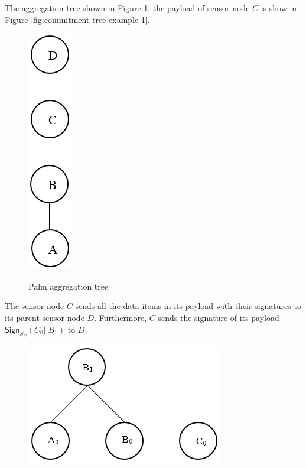 	\begin{exmp}
	The aggregation tree shown in Figure \ref{fig:Palm aggregation tree}, the payload of sensor node $C$ is show in Figure \ref{fig:commitment-tree-example-1}.
			\begin{figure}[h!]
				\centering
				\includegraphics[scale = 0.5]{images/palm-aggregation-tree.png}\\
				\caption{Palm aggregation tree}
				\label{fig:Palm aggregation tree}
			\end{figure}
		The sensor node $C$ sends all the data-items in its payload with their signatures to its parent sensor node $D$.
		Furthermore, $C$ sends the signature of its payload $\textsf{Sign}_{S_{C}}(C_{0}||B_{1})$ to $D$.\\
			\begin{figure}[h!]
				\centering
				\includegraphics[scale = 0.5]{images/commitment-payload-of-C.png}

\end{figure}
\end{exmp}

